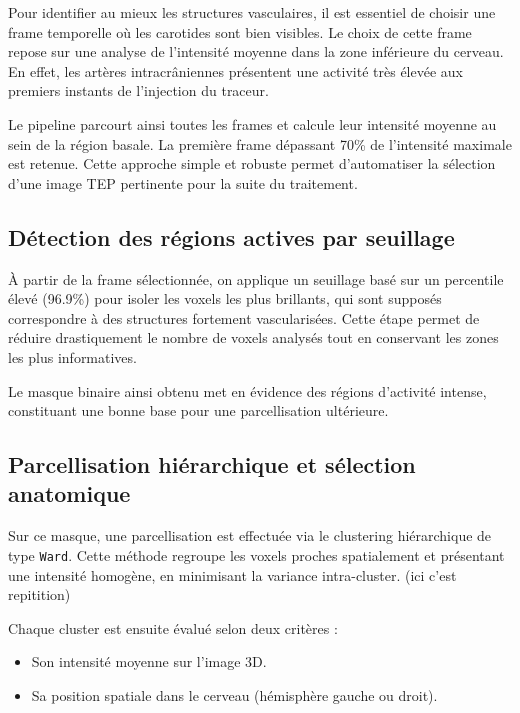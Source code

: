 \documentclass{article}
\begin{document}
        \noindent
        Pour identifier au mieux les structures vasculaires, il est essentiel de choisir une frame temporelle où les carotides sont bien visibles. Le choix de cette frame repose sur une analyse de l’intensité moyenne dans la zone inférieure du cerveau. En effet, les artères intracrâniennes présentent une activité très élevée aux premiers instants de l’injection du traceur.
        
        \noindent
        Le pipeline parcourt ainsi toutes les frames et calcule leur intensité moyenne au sein de la région basale. La première frame dépassant 70\% de l’intensité maximale est retenue. Cette approche simple et robuste permet d’automatiser la sélection d’une image TEP pertinente pour la suite du traitement.
        
    \vspace{0.5em}
    \subsection*{Détection des régions actives par seuillage}
        
        \noindent
        À partir de la frame sélectionnée, on applique un seuillage basé sur un percentile élevé (96.9\%) pour isoler les voxels les plus brillants, qui sont supposés correspondre à des structures fortement vascularisées. Cette étape permet de réduire drastiquement le nombre de voxels analysés tout en conservant les zones les plus informatives.
        
        \noindent
        Le masque binaire ainsi obtenu met en évidence des régions d’activité intense, constituant une bonne base pour une parcellisation ultérieure.
        
        \vspace{0.5em}
        \subsection*{Parcellisation hiérarchique et sélection anatomique}
        
        \noindent
        Sur ce masque, une parcellisation est effectuée via le clustering hiérarchique de type \texttt{Ward}. Cette méthode regroupe les voxels proches spatialement et présentant une intensité homogène, en minimisant la variance intra-cluster. (ici c'est repitition)
        
        \noindent
        Chaque cluster est ensuite évalué selon deux critères :
        \begin{itemize}
            \item Son intensité moyenne sur l’image 3D.
            \item Sa position spatiale dans le cerveau (hémisphère gauche ou droit).
        \end{itemize}
        
\end{document}
